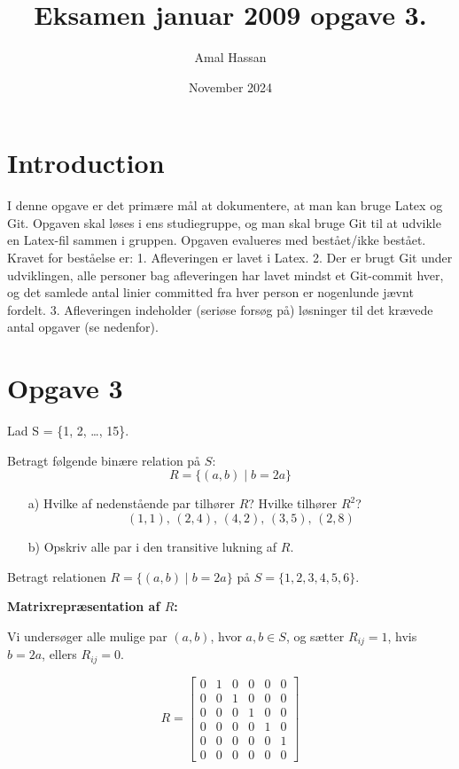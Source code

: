 \documentclass{article}
\title{Eksamen januar 2009 opgave 3.}
\author{Amal Hassan}
\date{November 2024}
\begin{document}
\maketitle

\section{Introduction}
I denne opgave er det primære mål at dokumentere, at man kan bruge Latex
og Git. Opgaven skal løses i ens studiegruppe, og man skal bruge Git til at
udvikle en Latex-fil sammen i gruppen. Opgaven evalueres med bestået/ikke
bestået. Kravet for beståelse er:
1. Afleveringen er lavet i Latex.
2. Der er brugt Git under udviklingen, alle personer bag afleveringen har
lavet mindst et Git-commit hver, og det samlede antal linier committed
fra hver person er nogenlunde jævnt fordelt.
3. Afleveringen indeholder (seriøse forsøg på) løsninger til det krævede
antal opgaver (se nedenfor).  

\section{Opgave 3} 
Lad S = \{1, 2, \ldots, 15\}. 

Betragt følgende binære relation på \( S \):
\[
R = \{(a, b) \mid b = 2a\}
\]

\begin{enumerate}
    \item[a)] Hvilke af nedenstående par tilhører \( R \)? Hvilke tilhører \( R^2 \)?
    \[
    (1, 1), \, (2, 4), \, (4, 2), \, (3, 5), \, (2, 8)
    \]

    \item[b)] Opskriv alle par i den transitive lukning af \( R \).
\end{enumerate}

Betragt relationen \( R = \{(a, b) \mid b = 2a\} \) på \( S = \{1, 2, 3, 4, 5, 6\} \).

\textbf{Matrixrepræsentation af \( R \):}

Vi undersøger alle mulige par \((a, b)\), hvor \( a, b \in S \), og sætter \( R_{ij} = 1 \), hvis \( b = 2a \), ellers \( R_{ij} = 0 \).



\[ 
R =
\begin{bmatrix}
0 & 1 & 0 & 0 & 0 & 0 \\ 
0 & 0 & 1 & 0 & 0 & 0 \\ 
0 & 0 & 0 & 1 & 0 & 0 \\ 
0 & 0 & 0 & 0 & 1 & 0 \\ 
0 & 0 & 0 & 0 & 0 & 1 \\ 
0 & 0 & 0 & 0 & 0 & 0
\end{bmatrix}
\]
\end{document}
